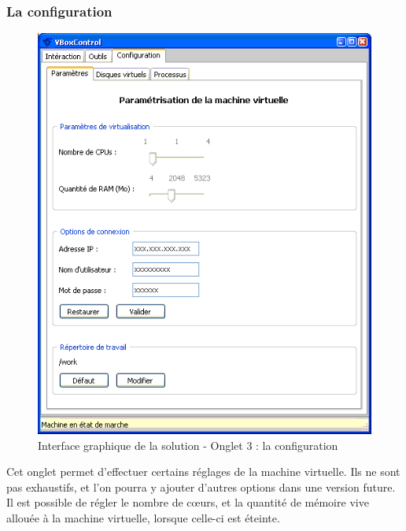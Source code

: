 
\subsubsection{La configuration}

\begin{figure}[!h]
	\center
	\includegraphics[scale=0.6]{images/Interface_solution_3.png}
	\caption{Interface graphique de la solution - Onglet 3 : la configuration}
	\label{Interface graphique de la solution - Onglet 3 : la configuration}
\end{figure}


Cet onglet permet d'effectuer certains réglages de la machine virtuelle.
Ils ne sont pas exhaustifs, et l'on pourra y ajouter d'autres options dans une version future.
\\

Il est possible de régler le nombre de cœurs, et la quantité de mémoire vive allouée à la machine virtuelle, lorsque celle-ci est éteinte.

